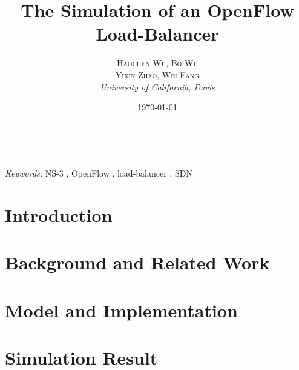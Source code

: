 \documentclass[11pt]{article} %
\title{\textbf{The Simulation of an OpenFlow Load-Balancer}} %
\author{\textsc{Haochen Wu, Bo Wu\\Yixin Zhao, Wei Fang} %
\\{\textit{University of California, Davis}}} %
\date{\today} %
\makeatletter
\renewcommand{\maketitle}{ %
\begin{flushright} %
{\LARGE\@title} %

\vspace{50pt} %

{\large\@author} %
\\\@date %

\vspace{40pt} %
\end{flushright}
}
\makeatother
\begin{document}
\maketitle %



\begin{abstract}

\end{abstract}

\hspace*{3,6mm}\textit{Keywords:} NS-3 , OpenFlow , load-balancer , SDN %

\vspace{30pt} %


\section{Introduction}



\section{Background and Related Work}



\section{Model and Implementation}



\section{Simulation Result}

\end{document}
